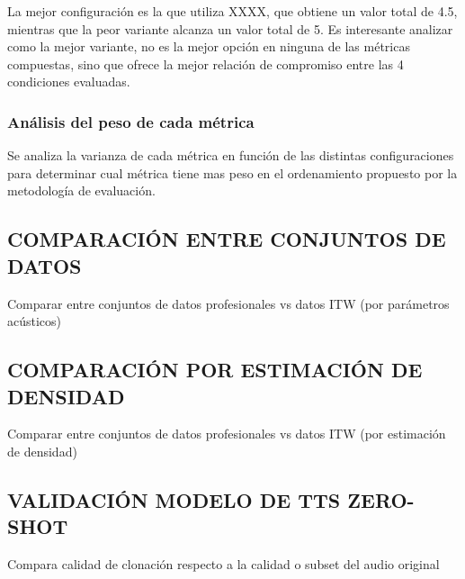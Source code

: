 La mejor configuración es la que utiliza XXXX, que obtiene un valor total de 4.5, mientras que la peor variante alcanza un valor total de 5.
Es interesante analizar como la mejor variante, no es la mejor opción en ninguna de las métricas compuestas, sino que ofrece la mejor relación de compromiso entre las 4 condiciones evaluadas.


\subsubsection{Análisis del peso de cada métrica}
Se analiza la varianza de cada métrica en función de las distintas configuraciones para determinar cual métrica tiene mas peso en el ordenamiento propuesto por la metodología de evaluación.

\subsection{COMPARACIÓN ENTRE CONJUNTOS DE DATOS}
Comparar entre conjuntos de datos profesionales vs datos ITW (por parámetros acústicos)

\subsection{COMPARACIÓN POR ESTIMACIÓN DE DENSIDAD}
Comparar entre conjuntos de datos profesionales vs datos ITW (por estimación de densidad)

\subsection{VALIDACIÓN MODELO DE TTS ZERO-SHOT}
Compara calidad de clonación respecto a la calidad o subset del audio original

